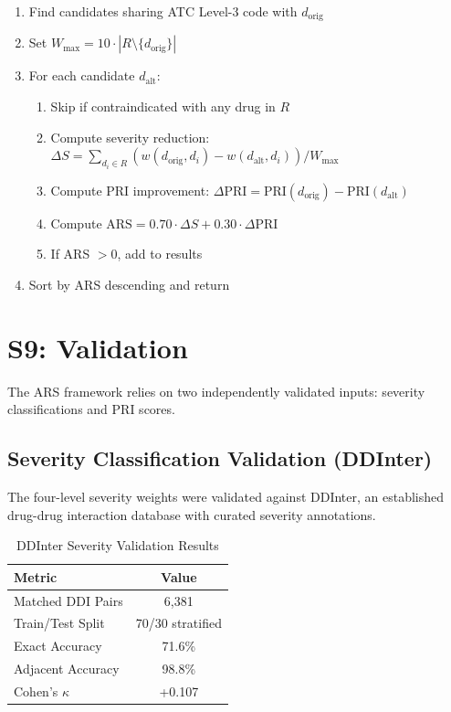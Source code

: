 \documentclass[11pt,a4paper]{article}
\begin{document}
\begin{enumerate}
    \item Find candidates sharing ATC Level-3 code with $d_{\text{orig}}$
    \item Set $W_{\text{max}} = 10 \cdot |R \setminus \{d_{\text{orig}}\}|$
    \item For each candidate $d_{\text{alt}}$:
    \begin{enumerate}
        \item Skip if contraindicated with any drug in $R$
        \item Compute severity reduction: $\Delta S = \sum_{d_i \in R}(w(d_{\text{orig}}, d_i) - w(d_{\text{alt}}, d_i)) / W_{\text{max}}$
        \item Compute PRI improvement: $\Delta \text{PRI} = \text{PRI}(d_{\text{orig}}) - \text{PRI}(d_{\text{alt}})$
        \item Compute $\text{ARS} = 0.70 \cdot \Delta S + 0.30 \cdot \Delta \text{PRI}$
        \item If ARS $> 0$, add to results
    \end{enumerate}
    \item Sort by ARS descending and return
\end{enumerate}

\section{S9: Validation}

The ARS framework relies on two independently validated inputs: severity classifications and PRI scores.

\subsection{Severity Classification Validation (DDInter)}

The four-level severity weights were validated against DDInter, an established drug-drug interaction database with curated severity annotations.

\begin{table}[H]
\centering
\caption{DDInter Severity Validation Results}
\label{tab:ddinter_validation}
\begin{tabular}{lc}
\toprule
\textbf{Metric} & \textbf{Value} \\
\midrule
Matched DDI Pairs & 6,381 \\
Train/Test Split & 70/30 stratified \\
Exact Accuracy & 71.6\% \\
Adjacent Accuracy & 98.8\% \\
Cohen's $\kappa$ & +0.107 \\
\bottomrule
\end{tabular}
\end{table}
\end{document}
